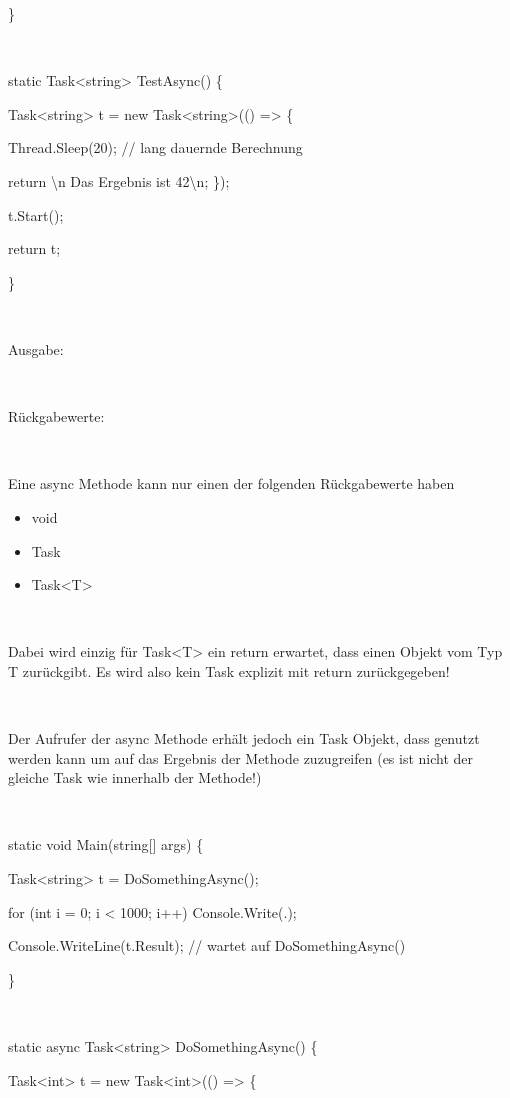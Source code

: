 \} 

~

static Task{\textless}string{\textgreater} TestAsync() \{ 

Task{\textless}string{\textgreater} t = new Task{\textless}string{\textgreater}(() ={\textgreater} \{ 

Thread.Sleep(20); // lang dauernde Berechnung 

return {\textquotedbl}{\textbackslash}n Das Ergebnis ist 42{\textbackslash}n{\textquotedbl}; \}); 

t.Start(); 

return t; 

\}

~

Ausgabe:

~

Rückgabewerte:

~

Eine async Methode kann nur einen der folgenden Rückgabewerte haben

\begin{itemize}
\item void
\item Task
\item Task{\textless}T{\textgreater}
\end{itemize}
~

Dabei wird einzig für Task{\textless}T{\textgreater} ein return erwartet, dass einen Objekt vom Typ T zurückgibt. Es wird also kein Task explizit mit return zurückgegeben!

~

Der Aufrufer der async Methode erhält jedoch ein Task Objekt, dass genutzt werden kann um auf das Ergebnis der Methode zuzugreifen (es ist nicht der gleiche Task wie innerhalb der Methode!)

~

static void Main(string[] args) \{ 

Task{\textless}string{\textgreater} t = DoSomethingAsync(); 

for (int i = 0; i {\textless} 1000; i++) Console.Write({\textquotedbl}.{\textquotedbl}); 

Console.WriteLine(t.Result); // wartet auf DoSomethingAsync()

\} 

~

static async Task{\textless}string{\textgreater} DoSomethingAsync() \{ 

Task{\textless}int{\textgreater} t = new Task{\textless}int{\textgreater}(() ={\textgreater} \{ 

